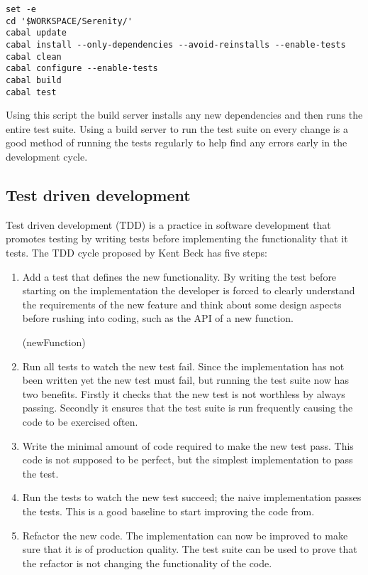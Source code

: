 \begin{verbatim}
set -e
cd '$WORKSPACE/Serenity/'
cabal update
cabal install --only-dependencies --avoid-reinstalls --enable-tests
cabal clean
cabal configure --enable-tests
cabal build
cabal test
\end{verbatim}

\noindent
Using this script the build server installs any new dependencies and then runs the
entire test suite. Using a build server to run the test suite on every change is a
good method of running the tests regularly to help find any errors early in the
development cycle.

\subsection{Test driven development}

Test driven development (TDD) is a practice in software development that promotes testing
by writing tests before implementing the functionality that it tests. The TDD cycle
proposed by Kent Beck has five steps:\cite{beck2003}

\begin{enumerate}
\item Add a test that defines the new functionality. By writing the test before starting on
	the implementation the developer is forced to clearly understand the requirements of
	the new feature and think about some design aspects before rushing into coding,
	such as the API of a new function.

\functions(newFunction)
\item Run all tests to watch the new test fail. Since the implementation has not been written
	yet the new test must fail, but running the test suite now has two benefits. Firstly
	it checks that the new test is not worthless by always passing. Secondly it ensures
	that the test suite is run frequently causing the code to be exercised often.

\item Write the minimal amount of code required to make the new test pass. This code is not
	supposed to be perfect, but the simplest implementation to pass the test.

\item Run the tests to watch the new test succeed; the naive implementation passes the tests.
	This is a good baseline to start improving the code from.

\item Refactor the new code. The implementation can now be improved to make sure that it is
	of production quality. The test suite can be used to prove that the refactor is not
	changing the functionality of the code.
\end{enumerate}

